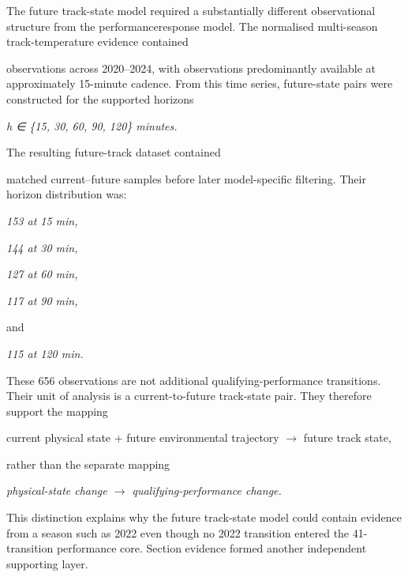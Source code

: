 The future track-state model required a substantially different observational structure from the performanceresponse model. The normalised multi-season track-temperature evidence contained

observations across 2020--2024, with observations predominantly available at approximately 15-minute cadence. From this time series, future-state pairs were constructed for the supported horizons

\begin{center}\textit{h ∈ \{15, 30, 60, 90, 120\} minutes.}\end{center}

The resulting future-track dataset contained

matched current--future samples before later model-specific filtering. Their horizon distribution was:

\begin{center}\textit{153 at 15 min,}\end{center}

\begin{center}\textit{144 at 30 min,}\end{center}

\begin{center}\textit{127 at 60 min,}\end{center}

\begin{center}\textit{117 at 90 min,}\end{center}

and

\begin{center}\textit{115 at 120 min.}\end{center}

These 656 observations are not additional qualifying-performance transitions. Their unit of analysis is a current-to-future track-state pair. They therefore support the mapping

current physical state + future environmental trajectory \ensuremath{\rightarrow} future track state,

rather than the separate mapping

\begin{center}\textit{physical-state change \ensuremath{\rightarrow} qualifying-performance change.}\end{center}

This distinction explains why the future track-state model could contain evidence from a season such as 2022 even though no 2022 transition entered the 41-transition performance core. Section evidence formed another independent supporting layer.

